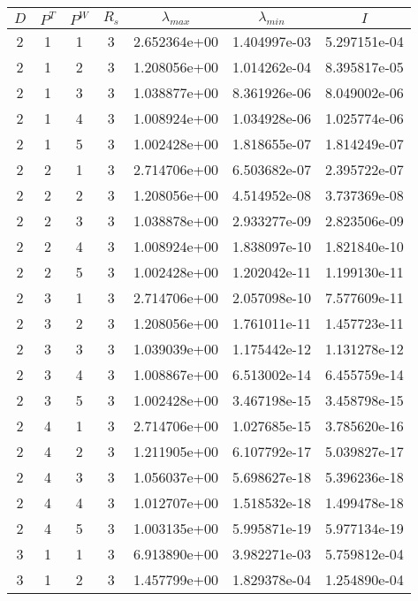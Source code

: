 \documentclass{article}
\begin{document}
\begin{small}
\begin{table}
\begin{center}
\begin{tabular}{|cccc|ccc|} \hline
$D$ & $P^T$  & $P^W$ & $R_s$ & $\lambda_{max}$ & $\lambda_{min}$   & $I$ \\
  \hline
2 & 1 & 1 & 3 & 2.652364e+00 & 1.404997e-03 & 5.297151e-04 \\ 
2 & 1 & 2 & 3 & 1.208056e+00 & 1.014262e-04 & 8.395817e-05 \\ 
2 & 1 & 3 & 3 & 1.038877e+00 & 8.361926e-06 & 8.049002e-06 \\ 
2 & 1 & 4 & 3 & 1.008924e+00 & 1.034928e-06 & 1.025774e-06 \\ 
2 & 1 & 5 & 3 & 1.002428e+00 & 1.818655e-07 & 1.814249e-07 \\ 
2 & 2 & 1 & 3 & 2.714706e+00 & 6.503682e-07 & 2.395722e-07 \\ 
2 & 2 & 2 & 3 & 1.208056e+00 & 4.514952e-08 & 3.737369e-08 \\ 
2 & 2 & 3 & 3 & 1.038878e+00 & 2.933277e-09 & 2.823506e-09 \\ 
2 & 2 & 4 & 3 & 1.008924e+00 & 1.838097e-10 & 1.821840e-10 \\ 
2 & 2 & 5 & 3 & 1.002428e+00 & 1.202042e-11 & 1.199130e-11 \\ 
2 & 3 & 1 & 3 & 2.714706e+00 & 2.057098e-10 & 7.577609e-11 \\ 
2 & 3 & 2 & 3 & 1.208056e+00 & 1.761011e-11 & 1.457723e-11 \\ 
2 & 3 & 3 & 3 & 1.039039e+00 & 1.175442e-12 & 1.131278e-12 \\ 
2 & 3 & 4 & 3 & 1.008867e+00 & 6.513002e-14 & 6.455759e-14 \\ 
2 & 3 & 5 & 3 & 1.002428e+00 & 3.467198e-15 & 3.458798e-15 \\ 
2 & 4 & 1 & 3 & 2.714706e+00 & 1.027685e-15 & 3.785620e-16 \\   
2 & 4 & 2 & 3 & 1.211905e+00 & 6.107792e-17 & 5.039827e-17 \\ 
2 & 4 & 3 & 3 & 1.056037e+00 & 5.698627e-18 & 5.396236e-18 \\ 
2 & 4 & 4 & 3 & 1.012707e+00 & 1.518532e-18 & 1.499478e-18 \\ 
2 & 4 & 5 & 3 & 1.003135e+00 & 5.995871e-19 & 5.977134e-19 \\ 
3 & 1 & 1 & 3 & 6.913890e+00 & 3.982271e-03 & 5.759812e-04 \\ 
3 & 1 & 2 & 3 & 1.457799e+00 & 1.829378e-04 & 1.254890e-04 \\ 

\end{tabular}
\end{center}
\end{table}
\end{small}
\end{document}
